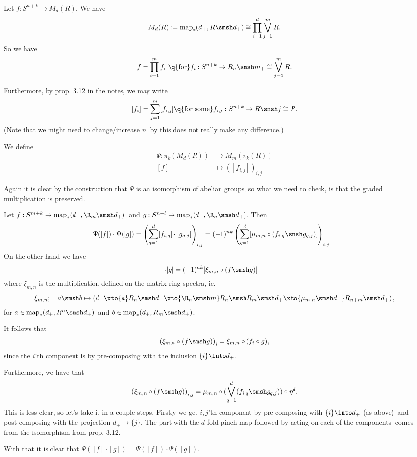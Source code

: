 \begin{exercise}[4]\ 

Let $f : S^{n+k} \to M_d(R)$. 
We have 
\[ M_d(R) := \map_*(d_+, R \smsh d_+) \cong \prod_{i=1}^{d}
\bigvee_{j=1}^{m} R. \] 
So we have
\[ f = \prod_{i=1}^m f_i \q{\text{for}} f_i : S^{n+k} \to R_n \smsh m_+ \cong \bigvee_{j=1}^{m} R.  \]

Furthermore, by prop. 3.12 in the notes, we may write 
\[ [f_i] = \sum_{j=1}^m [f_{i,j}] \q{\text{for some}} f_{i,j} : S^{n+k} \to R
\smsh j \cong R. \]
(Note that we might need to change/increase $n$, by this does not really make any
difference.) 

We define 
\begin{align*}
\Psi : \pi_k(M_d(R)) &\to M_m(\pi_k(R)) \\
[f] &\mapsto ([f_{i,j}])_{i,j}
\end{align*}

Again it is clear by the construction that $\Psi$ is an isomorphism of abelian
groups, so what we need to check, is that the graded multiplication is
preserved.

Let $f : S^{m+k} \to \map_*(d_+, \R_m\smsh d_+)$ and
$g : S^{n+l} \to \map_*(d_+, \R_n\smsh d_+)$. Then 
%
\begin{align*}
\Psi([f])\cdot \Psi([g]) &= \left(
\sum_{q=1}^d [f_{i,q}] \cdot [g_{q,j}] 
\right)_{i,j} 
= (-1)^{nk} \left(
\sum_{q=1}^d [\mu_{m,n} \circ (f_{i,q} \smsh g_{q,j})] 
\right)_{i,j}
\end{align*}
%
On the other hand we have 
\begin{align*}
[f] \cdot [g] &= (-1)^{nk} [\xi_{m,n} \circ (f \smsh g)]
\end{align*}
where $\xi_{m,n}$ is the multiplication defined on the matrix ring spectra, ie.
\[ \xi_{m,n};\quad a\smsh b \mapsto \left(d_+ \xto{a} R_n \smsh d_+ \xto{\R_n \smsh m} R_n
\smsh R_m \smsh d_+ \xto{\mu_{m,n}\smsh d_+} R_{n+m} \smsh d_+ \right), \]
for $a \in \map_*(d_+, R^n \smsh d_+)$ and $b \in \map_*(d_+,R_m\smsh d_+)$.

It follows that 
\[ \left(\xi_{m,n} \circ (f\smsh g) \right)_i = \xi_{m,n} \circ (f_i \circ g), \]
since the $i$'th component is by pre-composing with the inclusion $\{i\} \into d_+$.

Furthermore, we have that 
\[ \left(\xi_{m,n} \circ (f\smsh g)\right)_{i,j} = \mu_{m,n} \circ
(\bigvee_{q=1}^d (f_{i,q}\smsh g_{q,j})) \circ \eta^d.  \]
This is less clear, so let's take it in a couple steps. 
Firstly we get $i,j$'th component by pre-composing with $\{i\} \into d_+$ (as
above) and post-composing with the projection $d_+ \to \{j\}$. 
The part with the $d$-fold pinch map followed by acting on each of the
components, comes from the isomorphism from prop. 3.12.

With that it is clear that $\Psi([f]\cdot [g]) = \Psi([f]) \cdot \Psi([g])$. 
\end{exercise}



